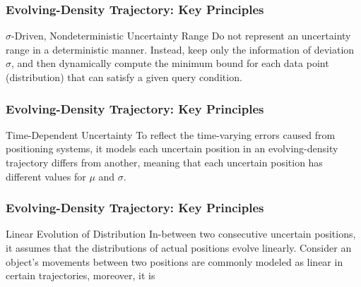 
\begin{frame}
\frametitle{Evolving-Density Trajectory: Key Principles}

\begin{block}{$\sigma$-Driven, Nondeterministic Uncertainty Range}
  Do not represent an uncertainty range in a deterministic manner. Instead, keep only the information of deviation $\sigma$, and then dynamically compute the minimum bound for each data point (distribution) that can satisfy a given query condition.
\end{block}

\end{frame}


\begin{frame}
\frametitle{Evolving-Density Trajectory: Key Principles}

\begin{block}{Time-Dependent Uncertainty}
  To reflect the time-varying errors caused from positioning systems, it models each uncertain position in an evolving-density trajectory differs from another, meaning that each uncertain position has different values for $\mu$ and $\sigma$.
\end{block}

\end{frame}


\begin{frame}
\frametitle{Evolving-Density Trajectory: Key Principles}

\begin{block}{Linear Evolution of Distribution}
  In-between two consecutive uncertain positions, it assumes that the distributions of actual positions evolve linearly. Consider an object's movements between two positions are commonly modeled as linear in certain trajectories, moreover, it is
\end{block}

\end{frame}


